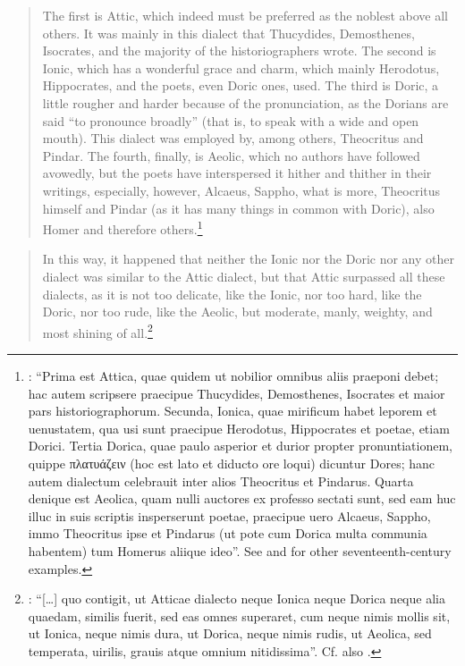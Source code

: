 \begin{quote}
The first is Attic, which indeed must be preferred as the noblest above all others. It was mainly in this dialect that Thucydides, Demosthenes, Isocrates, and the majority of the historiographers wrote. The second is Ionic, which has a wonderful grace and charm, which mainly Herodotus, Hippocrates, and the poets, even Doric ones, used. The third is Doric, a little rougher and harder because of the pronunciation, as the Dorians are said “to pronounce broadly” (that is, to speak with a wide and open mouth). This dialect was employed by, among others, Theocritus and Pindar. The fourth, finally, is Aeolic, which no authors have followed avowedly, but the poets have interspersed it hither and thither in their writings, especially, however, Alcaeus, Sappho, what is more, Theocritus himself and Pindar (as it has many things in common with Doric), also Homer and therefore others.\footnote{\citet[2--3]{Merigon1621}: “Prima est Attica, quae quidem ut nobilior omnibus aliis praeponi debet; hac autem scripsere praecipue Thucydides, Demosthenes, Isocrates et maior pars historiographorum. Secunda, Ionica, quae mirificum habet leporem et uenustatem, qua usi sunt praecipue Herodotus, Hippocrates et poetae, etiam Dorici. Tertia Dorica, quae paulo asperior et durior propter pronuntiationem, quippe πλατυάζειν (hoc est lato et diducto ore loqui) dicuntur Dores; hanc autem dialectum celebrauit inter alios Theocritus et Pindarus. Quarta denique est Aeolica, quam nulli auctores ex professo sectati sunt, sed eam huc illuc in suis scriptis insperserunt poetae, praecipue uero Alcaeus, Sappho, immo Theocritus ipse et Pindarus (ut pote cum Dorica multa communia habentem) tum Homerus aliique ideo”. See \citet{Hoius1620} and \citet{Rhenius1626} for other seventeenth-century examples.}
\end{quote}

\begin{quote}
In this way, it happened that neither the Ionic nor the Doric nor any other dialect was similar to the Attic dialect, but that Attic surpassed all these dialects, as it is not too delicate, like the Ionic, nor too hard, like the Doric, nor too rude, like the Aeolic, but moderate, manly, weighty, and most shining of all.\footnote{\citet[6]{Georgi1729}: “[…] quo contigit, ut Atticae dialecto neque Ionica neque Dorica neque alia quaedam, similis fuerit, sed eas omnes superaret, cum neque nimis mollis sit, ut Ionica, neque nimis dura, ut Dorica, neque nimis rudis, ut Aeolica, sed temperata, uirilis, grauis atque omnium nitidissima”. Cf. also \citet[197--199]{Ries1786}.}
\end{quote}

